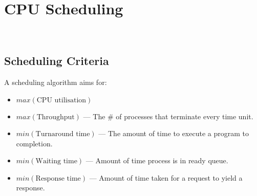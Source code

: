 \section{CPU Scheduling}

\


\subsection{Scheduling Criteria}

A scheduling algorithm aims for:

\begin{itemize}
    \item $max(\textrm{CPU utilisation})$
    \item $max(\textrm{Throughput})$ --- The \# of processes that terminate every time unit.
    \item $min(\textrm{Turnaround time})$ --- The amount of time to execute a program to completion.
    \item $min(\textrm{Waiting time})$ --- Amount of time process is in ready queue.
    \item $min(\textrm{Response time})$ --- Amount of time taken for a request to yield a response.
\end{itemize}




